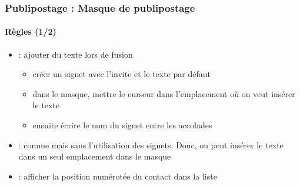 \documentclass[xcolor=table]{beamer}
\begin{document}
\begin{frame}
\frametitle{Publipostage : Masque de publipostage}
\framesubtitle{Règles (1/2)}

\begin{minipage}{0.63\textwidth}
	\begin{itemize}
		\item {} : ajouter du texte lors de fusion
		\begin{itemize}
			\item créer un signet avec l'invite et le texte par défaut
			\item dans le masque, mettre le curseur dans l'emplacement où on veut insérer le texte
			\item {} ensuite écrire le nom du signet entre les accolades
		\end{itemize}
		\item {} : comme  mais sans l'utilisation des signets. Donc, on peut insérer le texte dans un seul emplacement dans le masque
		\item {} : afficher la position numérotée du contact dans la liste
	\end{itemize}
\end{minipage}
\begin{minipage}{0.36\textwidth}
	
	
\end{minipage}

\end{frame}
\end{document}
